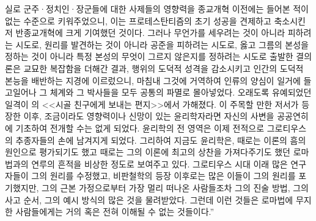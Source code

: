 실로
군주^^b7정치인^^b7장군들에 대한
사제들의
영향력을
종교개혁 이전에는 들어본 적이 없는 수준으로
키워주었으니, 이는
프로테스탄티즘의 초기 성공을 견제하고 축소시킨
저 반종교개혁에 크게 기여했던 것이다.
그러나 무언가를 세우려는 것이 아니라 피하려는 시도로,
원리를 발견하는 것이 아니라 공준을 피하려는 시도로,
옳고 그름의 본성을 정하는 것이 아니라
특정 본성의 무엇이 그르지 않은지를 정하려는 시도로
출발한 결의론은
교묘한 복잡함을 더해간 결과,
행위의 도덕적 성격을 감소시키고
인간의 도덕적 본능을 배반하는 지경에 이르렀으니,
마침내 그것에 거역하여 인류의 양심이 일거에 들고일어나
그 체계와 그 박사들을 모두 공통의 파멸로 몰아넣었다.
오래도록 유예되었던 일격이 의
<<시골 친구에게 보내는 편지>>에서
가해졌다.
이 주목할 만한 저서가 등장한 이후,
조금이라도 영향력이나 신망이 있는 윤리학자라면
자신의 사변을 공공연히 에 기초하여 전개할 수는 없게 되었다.
윤리학의 전 영역은 이제 전적으로
그로티우스의 추종자들의 손에 남겨지게 되었다.
그리하여 지금도 윤리학은,
때로는  이론의 흠의 원인으로 평가되기도 했고
때로는 그의 이론에 최고의 상찬을 가져다주기도 했던
로마법과의 연루의 흔적을
비상한 정도로 보여주고 있다.
그로티우스 시대 이래 많은 연구자들이 그의 원리를 수정했고,
비판철학의 등장 이후로는 많은 이들이 그의 원리를 포기했지만,
그의 근본 가정으로부터 가장 멀리 떠나온 사람들조차
그의 진술 방법, 그의 사고 순서, 그의 예시 방식의 많은 것을
물려받았다.
그런데 이런 것들은 로마법에 무지한 사람들에게는 거의 혹은 전혀
이해될 수 없는 것들이다.''

